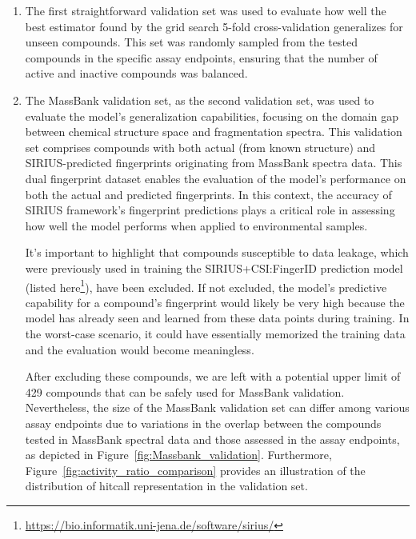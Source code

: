 \begin{enumerate}
    \item The first straightforward validation set was used to evaluate how well the best estimator found by the grid search 5-fold cross-validation generalizes for unseen compounds. This set was randomly sampled from the tested compounds in the specific assay endpoints, ensuring that the number of active and inactive compounds was balanced.
    \item The MassBank validation set, as the second validation set, was used to evaluate the model's generalization capabilities, focusing on the domain gap between chemical structure space and fragmentation spectra. This validation set comprises compounds with both actual (from known structure) and SIRIUS-predicted fingerprints originating from MassBank spectra data. This dual fingerprint dataset enables the evaluation of the model's performance on both the actual and predicted fingerprints. In this context, the accuracy of SIRIUS framework's fingerprint predictions plays a critical role in assessing how well the model performs when applied to environmental samples. 

    It's important to highlight that compounds susceptible to data leakage, which were previously used in training the SIRIUS+CSI:FingerID prediction model (listed here\footnote{\url{https://bio.informatik.uni-jena.de/software/sirius/}}), have been excluded. If not excluded, the model's predictive capability for a compound's fingerprint would likely be very high because the model has already seen and learned from these data points during training. In the worst-case scenario, it could have essentially memorized the training data and the evaluation would become meaningless.

    After excluding these compounds, we are left with a potential upper limit of 429 compounds that can be safely used for MassBank validation. Nevertheless, the size of the MassBank validation set can differ among various assay endpoints due to variations in the overlap between the compounds tested in MassBank spectral data and those assessed in the assay endpoints, as depicted in Figure~\ref{fig:Massbank_validation}. Furthermore, Figure~\ref{fig:activity_ratio_comparison} provides an illustration of the distribution of hitcall representation in the validation set.
    

\end{enumerate}
